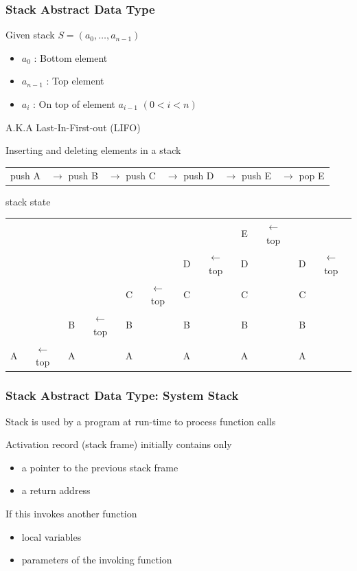 \documentclass[newPxFont,sthlmFooter,nooffset]{beamer}
\begin{document}
\begin{frame}[t]
  \frametitle{Stack Abstract Data Type}
Given stack $S = ( a_0, \ldots, a_{n-1})$
\begin{itemize}
\item $a_0$ : Bottom element
\item $a_{n-1}$ : Top element
\item $a_{i}$ : On top of element $a_{i-1}$ $(0 < i < n)$
\end{itemize}

A.K.A Last-In-First-out (LIFO)

\bigskip

Inserting and deleting elements in a stack
{\footnotesize  \begin{centering}
\begin{tabular}{!{}c<{}c<{}c<{}c<{}c<{}c}
push A & $\rightarrow$ push B &  $\rightarrow$ push C &  $\rightarrow$ push D &  $\rightarrow$ push E &  $\rightarrow$ pop E \\
    \end{tabular}
  \end{centering}}

{ stack state}

{\footnotesize  \begin{centering}
\begin{tabular}{!{} c<{}c<{}c<{}c<{}c<{}c<{}c<{}c<{}c<{}c<{}c<{}c}
      & &   & &    &  &   &  & E & $\leftarrow$ top &   & \\
      & &   &  &   &  & D & $\leftarrow$ top & D  & & D &  $\leftarrow$ top\\
      & &   &  & C & $\leftarrow$ top & C  & & C & & C &\\
      & & B & $\leftarrow$ top & B & & B & & B & & B &\\
      A & $\leftarrow$ top & A & & A & & A & & A & & A &\\
    \end{tabular}
  \end{centering}}
\end{frame}

\begin{frame}[t]
  \frametitle{Stack Abstract Data Type: System Stack}
Stack is used by a program at run-time to process function calls

Activation record (stack frame) initially contains only 
\begin{itemize}
\item a pointer to the previous stack frame
\item a return address
\end{itemize}
If this invokes another function
\begin{itemize}  
\item local variables
\item parameters of the invoking function
\end{itemize}

\end{frame}
\end{document}
